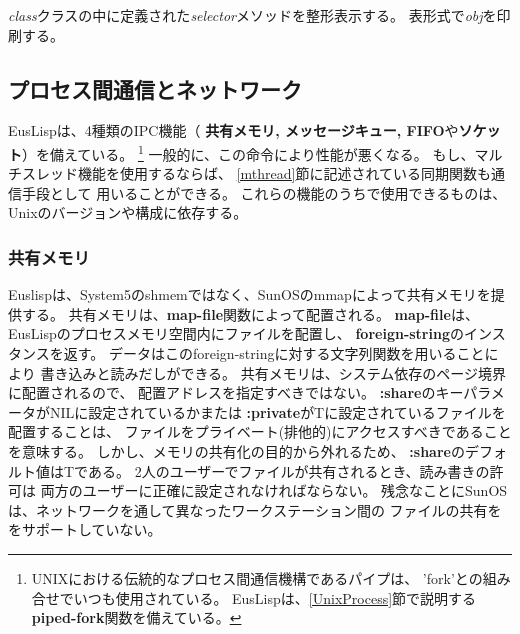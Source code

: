 \begin{refdesc}



{{\em class}クラスの中に定義された{\em selector}メソッドを整形表示する。}
{表形式で{\em obj}を印刷する。}



\end{refdesc}

\newpage

\subsection{プロセス間通信とネットワーク\label{IPC}}

EusLispは、4種類のIPC機能（
{\bf 共有メモリ, メッセージキュー, FIFO}や{\bf ソケット}）を備えている。
\footnote{UNIXにおける伝統的なプロセス間通信機構であるパイプは、
'fork'との組み合せでいつも使用されている。
EusLispは、\ref{UnixProcess}節で説明する{\bf piped-fork}関数を備えている。}
一般的に、この命令により性能が悪くなる。
もし、マルチスレッド機能を使用するならば、
\ref{mthread}節に記述されている同期関数も通信手段として
用いることができる。
これらの機能のうちで使用できるものは、Unixのバージョンや構成に依存する。

\subsubsection{共有メモリ}
Euslispは、System5のshmemではなく、SunOSのmmapによって共有メモリを提供する。
共有メモリは、{\bf map-file}関数によって配置される。
{\bf map-file}は、EusLispのプロセスメモリ空間内にファイルを配置し、
{\bf foreign-string}のインスタンスを返す。
データはこのforeign-stringに対する文字列関数を用いることにより
書き込みと読みだしができる。
共有メモリは、システム依存のページ境界に配置されるので、 
配置アドレスを指定すべきではない。
{\bf :share}のキーパラメータがNILに設定されているかまたは
{\bf :private}がTに設定されているファイルを配置することは、
ファイルをプライベート(排他的)にアクセスすべきであることを意味する。
しかし、メモリの共有化の目的から外れるため、
{\bf :share}のデフォルト値はTである。
2人のユーザーでファイルが共有されるとき、読み書きの許可は
両方のユーザーに正確に設定されなければならない。
残念なことにSunOSは、ネットワークを通して異なったワークステーション間の
ファイルの共有ををサポートしていない。

